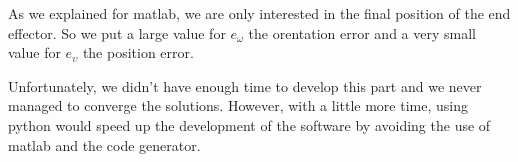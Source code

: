  As we explained for matlab, we are only interested in the final position of the end effector. So we put a large value for $e_\omega$ the orentation error and a very small value for $e_\upsilon$ the position error.
 
 \bigbreak
 Unfortunately, we didn't have enough time to develop this part and we never managed to converge the solutions. However, with a little more time, using python would speed up the development of the software by avoiding the use of matlab and the code generator.